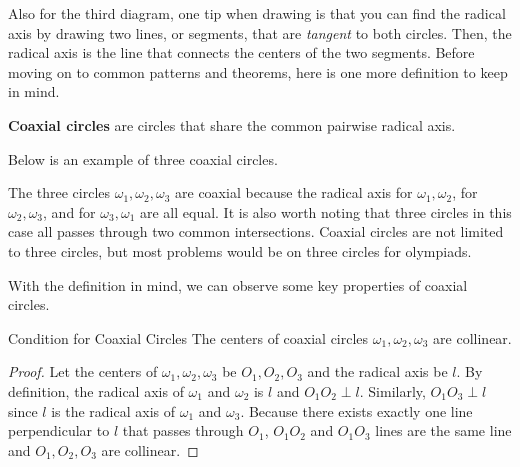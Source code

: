 \documentclass[../../../main.tex]{subfiles}
\begin{document}
Also for the third diagram, one tip when drawing is that you can
find the radical axis by drawing two lines, or segments, that are
\textit{tangent} to both circles. Then, the radical axis is the
line that connects the centers of the two segments. Before moving
on to common patterns and theorems, here is one more definition
to keep in mind.

\begin{definition}{}{}
\textbf{Coaxial circles} are circles that share the common pairwise
radical axis.
\end{definition}

Below is an example of three coaxial circles.

\begin{figure}[H]
\centering
{}
\end{figure}

The three circles $\omega_1, \omega_2, \omega_3$ are coaxial because
the radical axis for $\omega_1, \omega_2$, for $\omega_2, \omega_3$,
and for $\omega_3, \omega_1$ are all equal. It is also worth noting
that three circles in this case all passes through two common
intersections. Coaxial circles are not limited to three circles,
but most problems would be on three circles for olympiads.

With the definition in mind, we can observe some key properties
of coaxial circles.

\begin{theorem}{}{Condition for Coaxial Circles}
The centers of coaxial circles $\omega_1, \omega_2, \omega_3$ are
collinear.
\end{theorem}
\begin{proof}
Let the centers of $\omega_1, \omega_2, \omega_3$ be $O_1, O_2, O_3$
and the radical axis be $l$. By definition, the radical axis of
$\omega_1$ and $\omega_2$ is $l$ and $O_1O_2 \perp l$. Similarly,
$O_1O_3 \perp l$ since $l$ is the radical axis of $\omega_1$ and
$\omega_3$. Because there exists exactly one line perpendicular to
$l$ that passes through $O_1$, $O_1O_2$ and $O_1O_3$ lines are the
same line and $O_1,O_2,O_3$ are collinear.
\end{proof}
\end{document}
